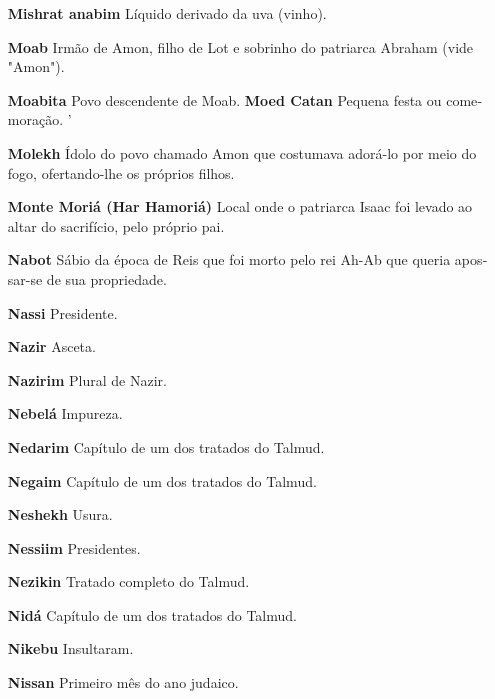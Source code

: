\begin{itemize}
\begin{enumrate}
\begin{itemize}
\begin{itemize}
\begin{itemize}
\begin{itemize}
\begin{itemize}
\item[\textbf{Mishrat anabim}] Líquido derivado da uva (vinho).

\item[\textbf{Moab}] Irmão de Amon, filho de Lot e sobrinho do patriarca
Abraham (vi­de "Amon").

\item[\textbf{Moabita} Povo descendente de Moab. \textbf{Moed Catan}]
Pequena festa ou come­moração. '

\item[\textbf{Molekh}] Ídolo do povo chamado Amon que costumava adorá-lo por
meio do fogo, ofertando-lhe os pró­prios filhos.

\item[\textbf{Monte Moriá (Har Hamoriá)}] Local onde o patriarca Isaac foi
levado ao al­tar do sacrifício, pelo próprio pai.

\item[\textbf{Nabot}] Sábio da época de Reis que foi morto pelo rei Ah-Ab que
queria apos­sar-se de sua propriedade.

\item[\textbf{Nassi}] Presidente.

\item[\textbf{Nazir}] Asceta.

\item[\textbf{Nazirim}] Plural de Nazir.

\item[\textbf{Nebelá}] Impureza.

\item[\textbf{Nedarim}] Capítulo de um dos trata­dos do Talmud.

\item[\textbf{Negaim}] Capítulo de um dos tratados do Talmud.

\item[\textbf{Neshekh}] Usura.

\item[\textbf{Nessiim}] Presidentes.

\item[\textbf{Nezikin}] Tratado completo do Tal­mud.

\item[\textbf{Nidá}] Capítulo de um dos tratados do Talmud.

\item[\textbf{Nikebu}] Insultaram.

\item[\textbf{Nissan}] Primeiro mês do ano judai­co.


\end{itemize}
\end{itemize}
\end{itemize}
\end{itemize}
\end{itemize}
\end{enumrate}
\end{itemize}
